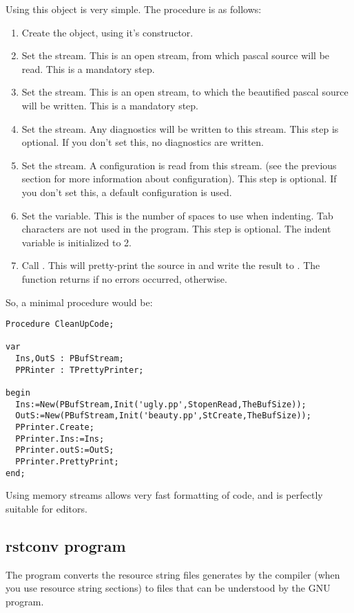 \documentclass{book}
\begin{document}
Using this object is very simple. The procedure is as follows:
\begin{enumerate}
\item Create the object, using it's constructor.
\item Set the  stream. This is an open stream, from which pascal source will be
read. This is a mandatory step.
\item Set the  stream. This is an open stream, to which the
beautified pascal source will be written. This is a mandatory step.
\item Set the  stream. Any diagnostics will be written to this
stream. This step is optional. If you don't set this, no diagnostics are
written.
\item Set the  stream. A configuration is read from this stream.
(see the previous section for more information about configuration). This
step is optional. If you don't set this, a default configuration is used.
\item Set the  variable. This is the number of spaces to use
when indenting. Tab characters are not used in the program. This step is
optional. The indent variable is initialized to 2.
\item Call . This will pretty-print the source in 
and write the result to . The function returns  if no
errors occurred,  otherwise.
\end{enumerate}

So, a minimal procedure would be:
\begin{verbatim}
Procedure CleanUpCode;

var
  Ins,OutS : PBufStream;
  PPRinter : TPrettyPrinter;

begin
  Ins:=New(PBufStream,Init('ugly.pp',StopenRead,TheBufSize));
  OutS:=New(PBufStream,Init('beauty.pp',StCreate,TheBufSize));
  PPrinter.Create;
  PPrinter.Ins:=Ins;
  PPrinter.outS:=OutS;
  PPrinter.PrettyPrint;
end;
\end{verbatim}

Using memory streams allows very fast formatting of code, and is perfectly
suitable for editors.

\subsection{rstconv program}

The  program converts the resource string files generates by
the compiler (when you use resource string sections) to  files
that can be understood by the GNU  program.
\end{document}
